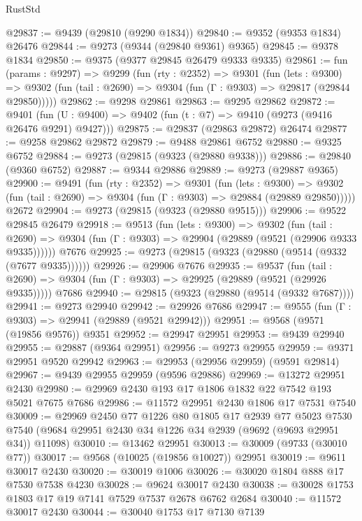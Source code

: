 \begin{lexlean}{RustStd}
\begin{coremodule}
{\begin{coremodule}
{{{{{{{{{{{{{{{{{{{{{{{{{{{{{{{{{{{{{{{{{{{{{{{{{{{{{{{@29837 := @9439 (@29810 (@9290 @1834))
@29840 := @9352 (@9353 @1834) @26476
@29844 := @9273 (@9344 (@29840 @9361) @9365)
@29845 := @9378 @1834
@29850 := @9375 (@9377 @29845 @26479 @9333 @9335)
@29861 := fun (params : @9297) =>
  @9299
    (fun (rty : @2352) =>
    @9301
      (fun (lets : @9300) =>
      @9302 (fun (tail : @2690) => @9304 (fun (Γ : @9303) => @29817 (@29844 @29850)))))
@29862 := @9298 @29861
@29863 := @9295 @29862
@29872 := @9401
    (fun (U : @9400) => @9402 (fun (t : @7) => @9410 (@9273 (@9416 @26476 @9291) @9427)))
@29875 := @29837 (@29863 @29872) @26474
@29877 := @9258 @29862 @29872
@29879 := @9488 @29861 @6752
@29880 := @9325 @6752
@29884 := @9273 (@29815 (@9323 (@29880 @9338)))
@29886 := @29840 (@9360 @6752)
@29887 := @9344 @29886
@29889 := @9273 (@29887 @9365)
@29900 := @9491
    (fun (rty : @2352) =>
    @9301
      (fun (lets : @9300) =>
      @9302 (fun (tail : @2690) => @9304 (fun (Γ : @9303) => @29884 (@29889 @29850)))))
    @2672
@29904 := @9273 (@29815 (@9323 (@29880 @9515)))
@29906 := @9522 @29845 @26479
@29918 := @9513
    (fun (lets : @9300) =>
    @9302
      (fun (tail : @2690) =>
      @9304 (fun (Γ : @9303) => @29904 (@29889 (@9521 (@29906 @9333 @9335))))))
    @7676
@29925 := @9273 (@29815 (@9323 (@29880 (@9514 (@9332 (@7677 @9335))))))
@29926 := @29906 @7676
@29935 := @9537
    (fun (tail : @2690) => @9304 (fun (Γ : @9303) => @29925 (@29889 (@9521 (@29926 @9335)))))
    @7686
@29940 := @29815 (@9323 (@29880 (@9514 (@9332 @7687))))
@29941 := @9273 @29940
@29942 := @29926 @7686
@29947 := @9555 (fun (Γ : @9303) => @29941 (@29889 (@9521 @29942)))
@29951 := @9568 (@9571 (@19856 @9576)) @9351
@29952 := @29947 @29951
@29953 := @9439 @29940
@29955 := @29887 (@9364 @29951)
@29956 := @9273 @29955
@29959 := @9371 @29951 @9520 @29942
@29963 := @29953 (@29956 @29959) (@9591 @29814)
@29967 := @9439 @29955 @29959 (@9596 @29886)
@29969 := @13272 @29951 @2430
@29980 := @29969 @2430 @193 @17 @1806 @1832 @22 @7542 @193 @5021 @7675 @7686
@29986 := @11572 @29951 @2430 @1806 @17 @7531 @7540
@30009 := @29969
    @2450
    @77
    @1226
    @80
    @1805
    @17
    @2939
    @77
    @5023
    @7530
    @7540
    (@9684 @29951 @2430 @34 @1226 @34 @2939 (@9692 (@9693 @29951 @34)) @11098)
@30010 := @13462 @29951
@30013 := @30009 (@9733 (@30010 @77))
@30017 := @9568 (@10025 (@19856 @10027)) @29951
@30019 := @9611 @30017 @2430
@30020 := @30019 @1006
@30026 := @30020 @1804 @888 @17 @7530 @7538 @4230
@30028 := @9624 @30017 @2430
@30038 := @30028 @1753 @1803 @17 @19 @7141 @7529 @7537 @2678 @6762 @2684
@30040 := @11572 @30017 @2430
@30044 := @30040 @1753 @17 @7130 @7139
}}}}}}}}}}}}}}}}}}}}}}}}}}}}}}}}}}}}}}}}}}}}}}}}}}}}}}}
\end{coremodule}}
\end{coremodule}
\end{lexlean}
